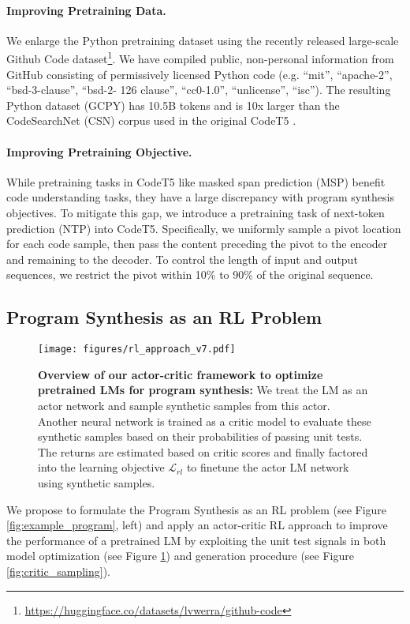 \documentclass{article}
\begin{document}
\paragraph{Improving Pretraining Data.}
We enlarge the Python pretraining dataset using the recently released large-scale Github Code dataset\footnote{\url{https://huggingface.co/datasets/lvwerra/github-code}}. 
We have compiled public, non-personal information from GitHub consisting of permissively licensed Python code
(e.g. “mit”, “apache-2”, “bsd-3-clause”, “bsd-2- 126 clause”, “cc0-1.0”, “unlicense”, “isc”). The resulting Python dataset (GCPY) has 10.5B tokens and is 10x larger than the CodeSearchNet (CSN) corpus \citep{csn} used in the original CodeT5 \citep{codet5}.


\paragraph{Improving Pretraining Objective.}
While pretraining tasks in CodeT5 like masked span prediction (MSP) benefit code understanding tasks, they have a large discrepancy with program synthesis objectives.
To mitigate this gap, we introduce a pretraining task of next-token prediction (NTP) into CodeT5. Specifically, we uniformly sample a pivot location for each code sample, then pass the content preceding the pivot to the encoder and remaining to the decoder.
To control the length of input and output sequences, we restrict the pivot within 10\% to 90\% of the original sequence.  
\subsection{Program Synthesis as an RL Problem}
\label{subsec:rl_finetune}

\begin{figure}[t]
	\centering
	\resizebox{1.0\textwidth}{!} {
	\texttt{[image: figures/rl\_approach\_v7.pdf]}
	}
	\caption{
	\textbf{Overview of our actor-critic framework to optimize pretrained LMs for program synthesis:}
	We treat the LM as an actor network and sample synthetic samples from this actor.
	Another neural network is trained as a critic model to evaluate these synthetic samples based on their probabilities of passing unit tests. 
	The returns are estimated based on critic scores and finally factored into the learning objective $\mathcal{L}_{rl}$ to finetune the actor LM network using synthetic samples. 
	}
	\label{fig:rl_approach}
\end{figure}

We propose to formulate the Program Synthesis as an RL problem (see Figure \ref{fig:example_program}, left) and apply an actor-critic RL approach to improve the performance of a pretrained LM by exploiting the unit test signals in both model optimization (see Figure \ref{fig:rl_approach}) and generation procedure (see Figure \ref{fig:critic_sampling}). 
\end{document}
